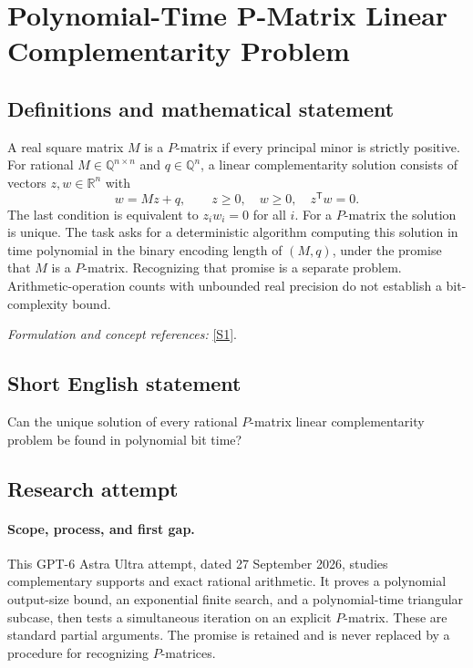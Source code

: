 \documentclass[11pt]{article}
\begin{document}
\section*{\texorpdfstring{Polynomial-Time P-Matrix Linear Complementarity Problem}{Polynomial-Time P-Matrix Linear Complementarity Problem}}\label{statement}
\subsection{Definitions and mathematical statement}
A real square matrix $M$ is a $P$-matrix if every principal minor is strictly positive. For rational $M\in{\mathbb{Q}}^{n\times n}$ and $q\in{\mathbb{Q}}^n$, a linear complementarity solution consists of vectors $z,w\in{\mathbb{R}}^n$ with
\[
 w=Mz+q,\qquad z\ge0,\quad w\ge0,\quad z^{\mathsf T}w=0.
\]
The last condition is equivalent to $z_iw_i=0$ for all $i$. For a $P$-matrix the solution is unique. The task asks for a deterministic algorithm computing this solution in time polynomial in the binary encoding length of $(M,q)$, under the promise that $M$ is a $P$-matrix. Recognizing that promise is a separate problem. Arithmetic-operation counts with unbounded real precision do not establish a bit-complexity bound.
\par\smallskip\textit{Formulation and concept references:} \href{https://arxiv.org/abs/2008.08992}{[S1]}.

\subsection{Short English statement}
Can the unique solution of every rational $P$-matrix linear complementarity problem be found in polynomial bit time?
\subsection{Research attempt}
\paragraph{Scope, process, and first gap.}
This GPT-6 Astra Ultra attempt, dated 27 September 2026, studies complementary supports and exact rational arithmetic. It proves a polynomial output-size bound, an exponential finite search, and a polynomial-time triangular subcase, then tests a simultaneous iteration on an explicit $P$-matrix. These are standard partial arguments. The promise is retained and is never replaced by a procedure for recognizing $P$-matrices.
\end{document}
